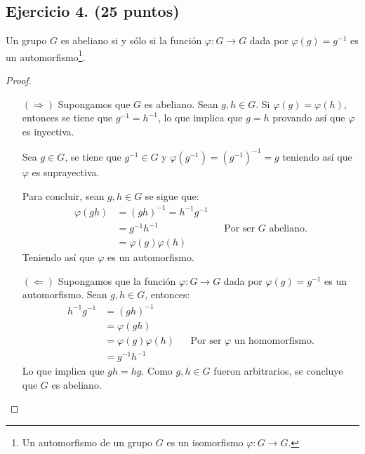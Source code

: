\documentclass[letterpaper]{article}
\begin{document}
\subsection*{Ejercicio 4. (25 puntos)}
Un grupo $G$ es abeliano si y sólo si la función $\varphi : G \to G$ dada por $\varphi(g) = g^{-1}$
es un automorfismo\footnote{Un automorfismo de un grupo $G$ es un isomorfismo $\varphi : G \to G$.}.

\begin{proof}
\hfill
\begin{itemize}
    \item[$(\Longrightarrow)$] Supongamos que $G$ es abeliano. Sean $g, h \in G$. Si $\varphi(g) = \varphi(h)$,
    entonces se tiene que $g^{-1} = h^{-1}$, lo que implica que $g = h$ provando así que $\varphi$ es inyectiva.

    Sea $g \in G$, se tiene que $g^{-1} \in G$ y $\varphi(g^{-1}) = (g^{-1})^{-1} = g$ teniendo así que $\varphi$ es
    suprayectiva.

    Para concluir, sean $g, h \in G$ se sigue que:
    \begin{align*}
        \varphi(gh)
            &= (gh)^{-1} = h^{-1}g^{-1}\\
            &= g^{-1}h^{-1} && \text{Por ser $G$ abeliano.}\\
            &= \varphi(g)\varphi(h)
    \end{align*}
    Teniendo así que $\varphi$ es un automorfismo.

    \item[$(\Longleftarrow)$] Supongamos que la función $\varphi : G \to G$ dada por $\varphi(g) = g^{-1}$
    es un automorfismo. Sean $g, h \in G$, entonces:
    \begin{align*}
        h^{-1}g^{-1}
            &= (gh)^{-1}\\
            &= \varphi(gh)\\
            &= \varphi(g)\varphi(h) && \text{Por ser $\varphi$ un homomorfismo.}\\
            &= g^{-1}h^{-1}
    \end{align*}
    Lo que implica que $gh = hg$. Como $g, h \in G$ fueron arbitrarios, se concluye que $G$ es abeliano.
\end{itemize}
\end{proof}





\end{document}
